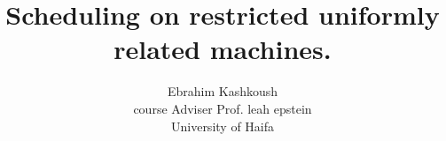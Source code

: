 \documentclass[11pt,fullpage]{article}
\begin{document}
 \newtheorem{theorem}{Theorem}[section]
 \newtheorem{corollary}{Corollary}[section]
 \newtheorem{lemma}{Lemma}[section]
 \newtheorem{exercise}{Exercise}
 \newtheorem{claim}{Claim}[section]
 \newtheorem{definition}{Definition}[section]
\def \n { \{1..n \} }
\def\proof{\noindent{\bf Proof:~}}
\def\Proof{\noindent{\bf Proof:~}}
\def\blackslug{\hbox{\hskip 1pt \vrule width 4pt height 8pt
    depth 1.5pt \hskip 1pt}}
\def\QED{\quad\blackslug\lower 8.5pt\null\par}
\def\mul {\times}
\def \lr {\longrightarrow}
\def \sr {\longrightarrow}
\def \Lr {\longleftarrow}
\def \dr {{\downarrow}}
\def \bs {\backslash }
\newcommand \nxt[1]{
             \stackrel{#1}{\lr}
}
 
\newcommand \sss[1]{
            \begin{array}[t]{l}
             #1\stackrel{\mbox{\tiny no}}{\lr}\\
             \dr
            \end{array}
}
\newcommand {\spp}[1] {
           \begin{picture}(30,30)
           \put(10,20){\sequence(1,0){20}}
           \put(10,20){\sequence(0,-1){20}}
           \put(16,22){n}
           \put(6,10){y}
           \put(0,22){#1}
           \end{picture}
         }
 

\newcommand{\utrans}[3]{
\begin{center}\tt
\renewcommand{\arraystretch}{1.4}
\begin{tabular}{|p{#3 mm}|}
\hline
\vspace*{-3ex}~\parbox{0pt}{\begin{tabbing} #1 \end{tabbing}} \\ \hline
#2 \\
\hline
\end{tabular}
\end{center}
}

%
\title{Scheduling on restricted uniformly related machines.}
\author{Ebrahim Kashkoush   \\
course Adviser Prof. leah epstein \\
 University of Haifa
      }
\end{document}
